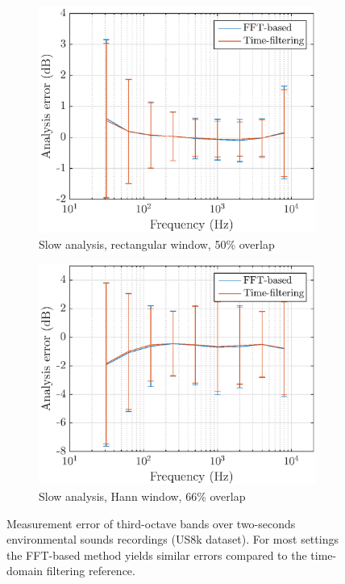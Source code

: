 \documentclass[sensors,article,submit,moreauthors,pdftex,10pt,a4paper]{mdpi}
\begin{document}
\begin{figure}[h!]
	\begin{subfigure}[h]{0.45\textwidth}
        \centering
        \includegraphics[width=1\textwidth]{figures/err_m_u_s_r.eps}
        \caption{Slow analysis, rectangular window, 50\% overlap}
    \end{subfigure}
    \hfill
    \begin{subfigure}[h]{0.45\textwidth}
        \centering
        \includegraphics[width=1\textwidth]{figures/err_m_u_s_h.eps}
        \caption{Slow analysis, Hann window, 66\% overlap}
    \end{subfigure}
    \caption{Measurement error of third-octave bands over two-seconds environmental sounds recordings (US8k dataset). For most settings the FFT-based method yields similar errors compared to the time-domain filtering reference. \label{fig:errormu}}
\end{figure}
\end{document}
